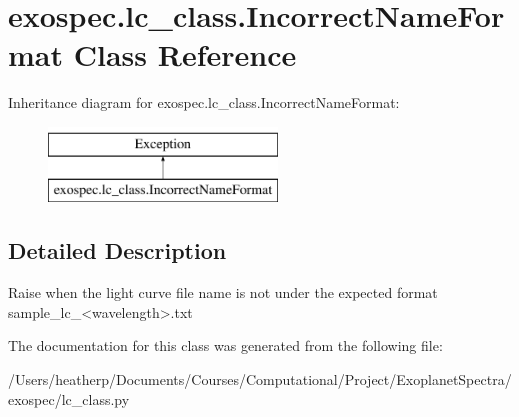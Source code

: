\hypertarget{classexospec_1_1lc__class_1_1_incorrect_name_format}{}\section{exospec.\+lc\+\_\+class.\+Incorrect\+Name\+Format Class Reference}
\label{classexospec_1_1lc__class_1_1_incorrect_name_format}
Inheritance diagram for exospec.\+lc\+\_\+class.\+Incorrect\+Name\+Format\+:\begin{figure}[H]
\begin{center}
\leavevmode
\includegraphics[height=2.000000cm]{classexospec_1_1lc__class_1_1_incorrect_name_format}
\end{center}
\end{figure}


\subsection{Detailed Description}
\begin{DoxyVerb}Raise when the light curve file name is not under the expected format sample_lc_<wavelength>.txt\end{DoxyVerb}
 

The documentation for this class was generated from the following file\+:\begin{DoxyCompactItemize}
\item 
/\+Users/heatherp/\+Documents/\+Courses/\+Computational/\+Project/\+Exoplanet\+Spectra/exospec/lc\+\_\+class.\+py\end{DoxyCompactItemize}
